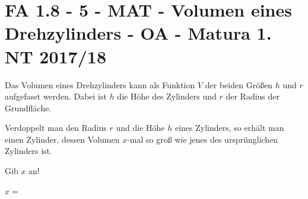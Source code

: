 \section{FA 1.8 - 5 - MAT - Volumen eines Drehzylinders - OA - Matura 1. NT 2017/18}

\begin{beispiel}[FA 1.8]{1}
Das Volumen eines Drehzylinders kann als Funktion $V$ der beiden Größen $h$ und $r$ aufgefasst werden. Dabei ist $h$ die Höhe des Zylinders und $r$ der Radius der Grundfläche.

Verdoppelt man den Radius $r$ und die Höhe $h$ eines Zylinders, so erhält man einen Zylinder, dessen Volumen $x$-mal so groß wie jenes des ursprünglichen Zylinders ist.

Gib $x$ an!\leer

$x=$\,
\end{beispiel}